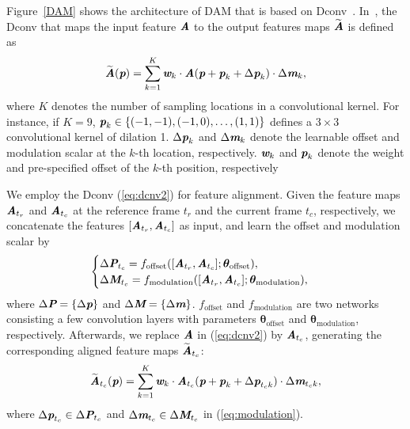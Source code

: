 \documentclass[review]{elsarticle}
\begin{document}
Figure~\ref{DAM} shows the architecture of DAM that is based on Dconv~\cite{zhu2019deformable}.
In~\cite{zhu2019deformable}, the Dconv that maps the input feature $\textit{\textbf{A}}$ to the output features maps $\widetilde{\textit{\textbf{A}}}$ is defined as
\begin{equation}
\label{eq:dcnv2}
\widetilde{\textit{\textbf{A}}}(\textit{\textbf{p}}) = \sum\limits_{k=1}^{K} \textit{\textbf{w}}_{k} \cdot \textit{\textbf{A}}(\textit{\textbf{p}}+\textit{\textbf{p}}_{k}+\Delta \textit{\textbf{p}}_{k}) \cdot \Delta \textit{\textbf{m}}_{k},
\end{equation}
where $K$ denotes the number of sampling locations in a convolutional kernel. For instance, if $K=9$, $\textit{\textbf{p}}_{k}\in \{(-1,-1),(-1,0),\ldots,(1,1)\}$ defines a $3\times 3$ convolutional kernel of dilation 1. $\Delta \textit{\textbf{p}}_{k}$ and $\Delta \textit{\textbf{m}}_{k}$ denote the learnable offset and modulation scalar at the $k$-th location, respectively. $\textit{\textbf{w}}_k$ and $\textit{\textbf{p}}_k$ denote the weight and pre-specified offset of the $k$-th position, respectively



We employ the Dconv (\ref{eq:dcnv2}) for feature alignment. Given the feature maps $\textit{\textbf{A}}_{t_r}$ and $\textit{\textbf{A}}_{t_c}$ at the reference frame $t_r$ and the current frame $t_c$, respectively, we concatenate the features $[\textit{\textbf{A}}_{t_r},\textit{\textbf{A}}_{t_c}]$ as input, and learn the offset and modulation scalar by
\begin{equation}
\begin{cases}
\Delta\textit{\textbf{P}}_{t_c}=f_{\mathrm{offset}}([\textit{\textbf{A}}_{t_r},\textit{\textbf{A}}_{t_c}];\bm{\theta}_{\mathrm{offset}}),\\
\Delta\textit{\textbf{M}}_{t_c}=f_{\mathrm{modulation}}([\textit{\textbf{A}}_{t_r},\textit{\textbf{A}}_{t_c}];\bm{\theta}_{\mathrm{modulation}}),
\end{cases}
\label{eq:modulation}
\end{equation}
where $\Delta\textit{\textbf{P}}=\{\Delta\textit{\textbf{p}}\}$ and $\Delta\textit{\textbf{M}}=\{\Delta\textit{\textbf{m}}\}$. $f_{\mathrm{offset}}$ and $f_{\mathrm{modulation}}$ are two networks consisting a few convolution layers with parameters $\bm{\theta}_{\mathrm{offset}}$ and $\bm{\theta}_{\mathrm{modulation}}$, respectively.
Afterwards, we replace $\textit{\textbf{A}}$ in (\ref{eq:dcnv2}) by $\textit{\textbf{A}}_{t_c}$, generating the corresponding aligned feature maps $\widetilde{\textit{\textbf{A}}}_{t_c}$:
\begin{equation}
\label{eq:DAM}
\widetilde{\textit{\textbf{A}}}_{t_c}(\textit{\textbf{p}}) = \sum\limits_{k=1}^{K} \textit{\textbf{w}}_{k} \cdot \textit{\textbf{A}}_{t_c}(\textit{\textbf{p}}+\textit{\textbf{p}}_{k}+\Delta \textit{\textbf{p}}_{t_ck}) \cdot \Delta \textit{\textbf{m}}_{t_ck},
\end{equation}
where $\Delta\textit{\textbf{p}}_{t_c}\in \Delta\textit{\textbf{P}}_{t_c}$ and $\Delta\textit{\textbf{m}}_{t_c}\in \Delta\textit{\textbf{M}}_{t_c}$ in (\ref{eq:modulation}).
\end{document}
